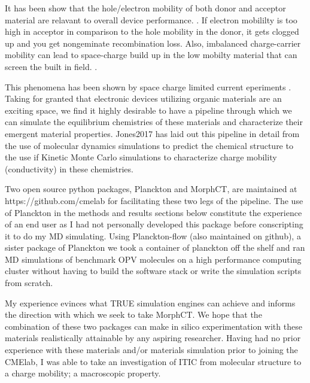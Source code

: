 It has been show that the hole/electron mobility of both donor and acceptor material are
relavant to overall device performance. \cite{Wang2019e}. If electron mobililty is too high
in acceptor  in comparison to the hole mobility in the donor, it gets clogged up and you get 
nongeminate recombination loss.
Also, imbalanced charge-carrier mobility can lead to space-charge build up in the low mobilty material that
can screen the built in field.  \cite{Bartelt2015}. 

This phenomena has been shown by space charge limited current eperiments \cite{Small2013}.
Taking for granted that electronic devices utilizing organic materials are an exciting
space,  we find it highly desirable to have a pipeline through which we can simulate the equilibrium
chemistries of these materials and characterize their emergent material properties. Jones2017 has laid out this
pipeline in detail from the use of molecular dynamics simulations to predict the chemical structure to the use
if Kinetic Monte Carlo simulations to characterize charge mobility (conductivity) in these chemistries.

Two open source python packages, Planckton and MorphCT, are maintained at https://github.com/cmelab for
facilitating these two legs of the pipeline. The use of Planckton in the methods and results sections below
constitute the experience of an end user as I had not personally developed this package before conscripting it
to do my MD simulating. Using Planckton-flow (also maintained on github), a sister package
of Planckton we took a container of planckton off the shelf and ran MD simulations of benchmark OPV
molecules on a high performance computing cluster without having to build the software stack or write the
simulation scripts from scratch. 

My experience evinces what TRUE simulation engines can achieve and
informs the direction with which we seek to take MorphCT. We hope that the combination of these two packages
can make in silico experimentation with these materials realistically attainable by any aspiring researcher.
Having had no prior experience with these materials and/or materials simulation prior to joining the CMElab,
I was able to take an investigation of ITIC from molecular
structure to a charge mobility; a macroscopic property. 

